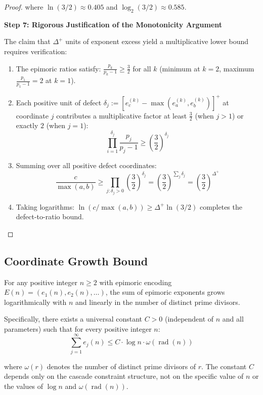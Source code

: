 \begin{proof}
where $\ln(3/2) \approx 0.405$ and $\log_2(3/2) \approx 0.585$.

\noindent \textbf{Step 7: Rigorous Justification of the Monotonicity Argument}

The claim that $\Delta^{+}$ units of exponent excess yield a multiplicative lower bound requires verification:

\begin{enumerate}
\item The epimoric ratios satisfy: $\frac{p_k}{p_k-1} \geq \frac{3}{2}$ for all $k$ (minimum at $k=2$, maximum $\frac{p_1}{p_1-1} = 2$ at $k=1$).
\item Each positive unit of defect $\delta_j := [e_c^{(k)} - \max(e_a^{(k)}, e_b^{(k)})]^+$ at coordinate $j$ contributes a multiplicative factor at least $\frac{3}{2}$ (when $j > 1$) or exactly $2$ (when $j = 1$):
$$\prod_{i=1}^{\delta_j} \frac{p_j}{p_j-1} \geq \left(\frac{3}{2}\right)^{\delta_j}$$
\item Summing over all positive defect coordinates:
$$\frac{c}{\max(a,b)} \geq \prod_{j: \delta_j > 0} \left(\frac{3}{2}\right)^{\delta_j} = \left(\frac{3}{2}\right)^{\sum_j \delta_j} = \left(\frac{3}{2}\right)^{\Delta^{+}}$$
\item Taking logarithms: $\ln(c/\max(a,b)) \geq \Delta^{+} \ln(3/2)$ completes the defect-to-ratio bound.
\end{enumerate}

\end{proof}


\subsection{Coordinate Growth Bound}
\label{subsec:coordinate-growth-bound}

\begin{lemma}
\label{lem:epimoric-coordinate-sum-bound}
For any positive integer $n \geq 2$ with epimoric encoding $E(n) = (e_1(n), e_2(n), \ldots)$, the sum of epimoric exponents grows logarithmically with $n$ and linearly in the number of distinct prime divisors.

Specifically, there exists a universal constant $C > 0$ (independent of $n$ and all parameters) such that for every positive integer $n$:
\begin{equation}
\sum_{j=1}^{\infty} e_j(n) \leq C \cdot \log n \cdot \omega(\operatorname{rad}(n))
\end{equation}

where $\omega(r)$ denotes the number of distinct prime divisors of $r$. The constant $C$ depends only on the cascade constraint structure, not on the specific value of $n$ or the values of $\log n$ and $\omega(\operatorname{rad}(n))$.
\end{lemma}

